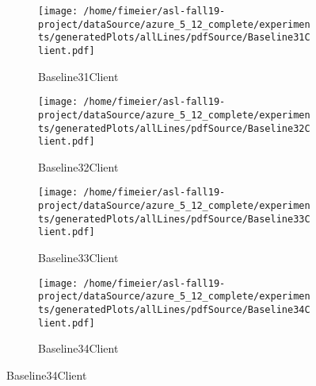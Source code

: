 \documentclass[11pt,a4paper]{article}
\begin{document}
\begin{figure}
	\begin{subfigure}[t]{.5\textwidth}
		\centering
		\texttt{[image: /home/fimeier/asl-fall19-project/dataSource/azure\_5\_12\_complete/experiments/generatedPlots/allLines/pdfSource/Baseline31Client.pdf]}
		\caption{Baseline31Client}
	\end{subfigure}
	\hfill
\begin{subfigure}[t]{0.5\textwidth}
		\centering
		\texttt{[image: /home/fimeier/asl-fall19-project/dataSource/azure\_5\_12\_complete/experiments/generatedPlots/allLines/pdfSource/Baseline32Client.pdf]}
		\caption{Baseline32Client}
	\end{subfigure}
	
	\medskip
	\begin{subfigure}[t]{.5\textwidth}
		\centering
		\texttt{[image: /home/fimeier/asl-fall19-project/dataSource/azure\_5\_12\_complete/experiments/generatedPlots/allLines/pdfSource/Baseline33Client.pdf]}
		\caption{Baseline33Client}
	\end{subfigure}
	\hfill
\begin{subfigure}[t]{.5\textwidth}
		\centering
		\texttt{[image: /home/fimeier/asl-fall19-project/dataSource/azure\_5\_12\_complete/experiments/generatedPlots/allLines/pdfSource/Baseline34Client.pdf]}
		\caption{Baseline34Client}
	\end{subfigure}
	
	\medskip
\end{figure}
\end{document}
